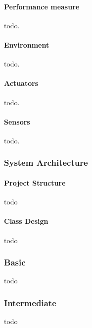 \documentclass[letterpaper,12pt]{article}
\begin{document}
\paragraph{Performance measure}\label{sec:performance-measures} todo.

\paragraph{Environment} todo.

\paragraph{Actuators} todo.

\paragraph{Sensors} todo.


\subsubsection{System Architecture}

\paragraph{Project Structure}

todo

\paragraph{Class Design}

todo


\subsubsection{Basic}

todo


\subsubsection{Intermediate}

todo

\end{document}
